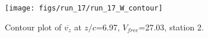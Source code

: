 \begin{figure}[H]
\centering
\texttt{[image: figs/run\_17/run\_17\_W\_contour]}
\caption{Contour plot of $\overline{v_{z}}$ at $z/c$=6.97, $V_{free}$=27.03, station 2.}
\label{fig:run_17_W_contour}
\end{figure}


